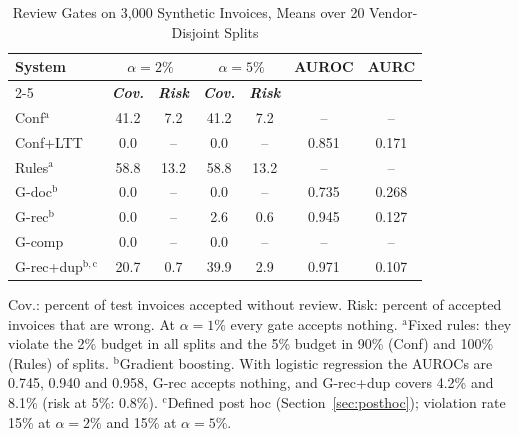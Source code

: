 \documentclass[conference]{IEEEtran}
\newcommand{\sysB}{\textsf{Conf}}          %
\newcommand{\sysBl}{\textsf{Conf+LTT}}     %
\newcommand{\sysBtwo}{\textsf{Rules}}      %
\newcommand{\sysBone}{\textsf{G-doc}}      %
\newcommand{\sysP}{\textsf{G-rec}}         %
\newcommand{\sysFC}{\textsf{G-comp}}       %
\newcommand{\sysPdup}{\textsf{G-rec+dup}}  %
\begin{document}
\begin{table}[t]
\caption{Review Gates on 3,000 Synthetic Invoices, Means over 20 Vendor-Disjoint Splits}
\begin{center}
\footnotesize
\setlength{\tabcolsep}{2.6pt}
\begin{tabular}{|l|c|c|c|c|c|c|}
\hline
\textbf{System} & \multicolumn{2}{c|}{\textbf{$\alpha=2\%$}} & \multicolumn{2}{c|}{\textbf{$\alpha=5\%$}} & \textbf{AUROC} & \textbf{AURC} \\
\cline{2-5}
 & \textbf{\textit{Cov.}} & \textbf{\textit{Risk}} & \textbf{\textit{Cov.}} & \textbf{\textit{Risk}} & & \\
\hline
\sysB$^{\mathrm{a}}$ & 41.2 & 7.2 & 41.2 & 7.2 & -- & -- \\
\sysBl & 0.0 & -- & 0.0 & -- & 0.851 & 0.171 \\
\sysBtwo$^{\mathrm{a}}$ & 58.8 & 13.2 & 58.8 & 13.2 & -- & -- \\
\sysBone$^{\mathrm{b}}$ & 0.0 & -- & 0.0 & -- & 0.735 & 0.268 \\
\sysP$^{\mathrm{b}}$ & 0.0 & -- & 2.6 & 0.6 & 0.945 & 0.127 \\
\sysFC & 0.0 & -- & 0.0 & -- & -- & -- \\
\hline
\sysPdup$^{\mathrm{b,c}}$ & 20.7 & 0.7 & 39.9 & 2.9 & 0.971 & 0.107 \\
\hline
\end{tabular}

\vspace{2pt}
\parbox{\columnwidth}{\footnotesize Cov.: percent of test invoices accepted
without review. Risk: percent of accepted invoices that are wrong. At
$\alpha=1\%$ every gate accepts nothing.
$^{\mathrm{a}}$Fixed rules: they violate the 2\% budget in all splits and the
5\% budget in 90\% (\sysB) and 100\% (\sysBtwo) of splits.
$^{\mathrm{b}}$Gradient boosting. With logistic regression the AUROCs are
0.745, 0.940 and 0.958, \sysP{} accepts nothing, and \sysPdup{} covers 4.2\% and
8.1\% (risk at 5\%: 0.8\%).
$^{\mathrm{c}}$Defined post hoc (Section~\ref{sec:posthoc}); violation rate 15\%
at $\alpha=2\%$ and 15\% at $\alpha=5\%$.}
\label{tab:main}
\end{center}
\end{table}
\end{document}

